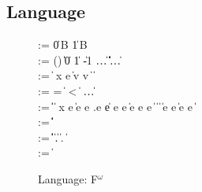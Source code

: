 \subsection{\Implang{} Language}
\label{sec:host-lang}
\begin{figure}[tp]
\small
\begin{bnf}
       \::= \cdot \| 0\,B \| 1\,B \\ 
    \::=
      () \| \itrue \| \ifalse \| 0 \| 1 \| -1 \| \dots \nlalt
      \ierr \| \data \| \off \| \iok \| \iecerr \| \iecpc \| \ldots \\

    \::= 
      \const \| %
       {\nrm x} e \| \ipair v v \nlalt
       \|  \|
       \\

    \::= 
      = \; \| \; < \; \| \inotop %
      \| \ldots \\

    \::= 
      \const \| \var \|  \|
       {\nrm x} e \| 
      \iapp e e \nlalt
    \Lambda \alpha{:}\gk.e \| e \; [\ty] \nlalt
       e \; e \|
      \iif e \; \ithen e \; \ielse e \nlalt
       \|  \|
       \|  \nlalt
       \nlalt
       \| \iappend e e \| \isub e {\nrm e} \nlalt
       \| 
      \\
      
    \::= 
      \iunitty \| \iboolty \| \iintty  \| 
      \invty \nlalt  \ibitsty \| \ioffty \| \iecty
  \\
   \meta{\ity} \::= 
      \ibasety \| \ityvar \| \iarrow \ity \ity \| \iprod \ity \ity \|
      \isum \ity \ity \nlalt
      \iseq \ity \| \forall \ityvar{:}\kappa.\ity  \|
      \imu \ityvar \ity   
      \| \lambda \alpha{:}\kappa.\ity 
      \| \ity \; \ity
  \\
   \meta{\kappa} \::= \kty \| \kappa \rightarrow \kappa
  
\end{bnf}
\caption{\Implang{} Language: F$^\omega$}
\label{fig:implang-syntax}
\end{figure}

